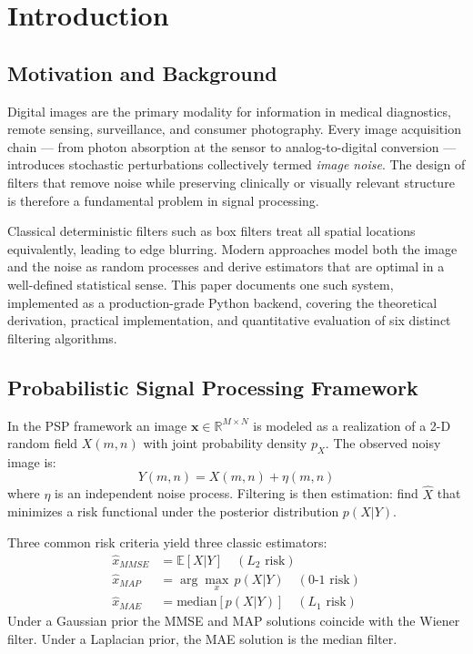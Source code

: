 \documentclass[10pt,conference]{IEEEtran}
\begin{document}
\section{Introduction}

\subsection{Motivation and Background}
Digital images are the primary modality for information in medical diagnostics, remote sensing, surveillance, and consumer photography. Every image acquisition chain --- from photon absorption at the sensor to analog-to-digital conversion --- introduces stochastic perturbations collectively termed \textit{image noise}. The design of filters that remove noise while preserving clinically or visually relevant structure is therefore a fundamental problem in signal processing.

Classical deterministic filters such as box filters treat all spatial locations equivalently, leading to edge blurring. Modern approaches model both the image and the noise as random processes and derive estimators that are optimal in a well-defined statistical sense. This paper documents one such system, implemented as a production-grade Python backend, covering the theoretical derivation, practical implementation, and quantitative evaluation of six distinct filtering algorithms.

\subsection{Probabilistic Signal Processing Framework}
In the PSP framework an image $\mathbf{x} \in \mathbb{R}^{M \times N}$ is modeled as a realization of a 2-D random field $X(m,n)$ with joint probability density $p_X$. The observed noisy image is:
\begin{equation}
Y(m,n) = X(m,n) + \eta(m,n)
\label{eq:model}
\end{equation}
where $\eta$ is an independent noise process. Filtering is then estimation: find $\hat{X}$ that minimizes a risk functional under the posterior distribution $p(X|Y)$.

Three common risk criteria yield three classic estimators:
\begin{align}
\hat{x}_{MMSE} &= \mathbb{E}[X|Y] \quad (L_2 \text{ risk}) \\
\hat{x}_{MAP}  &= \arg\max_x\, p(X|Y) \quad (0\text{-}1 \text{ risk}) \\
\hat{x}_{MAE}  &= \text{median}[p(X|Y)] \quad (L_1 \text{ risk})
\end{align}
Under a Gaussian prior the MMSE and MAP solutions coincide with the Wiener filter. Under a Laplacian prior, the MAE solution is the median filter.
\end{document}
